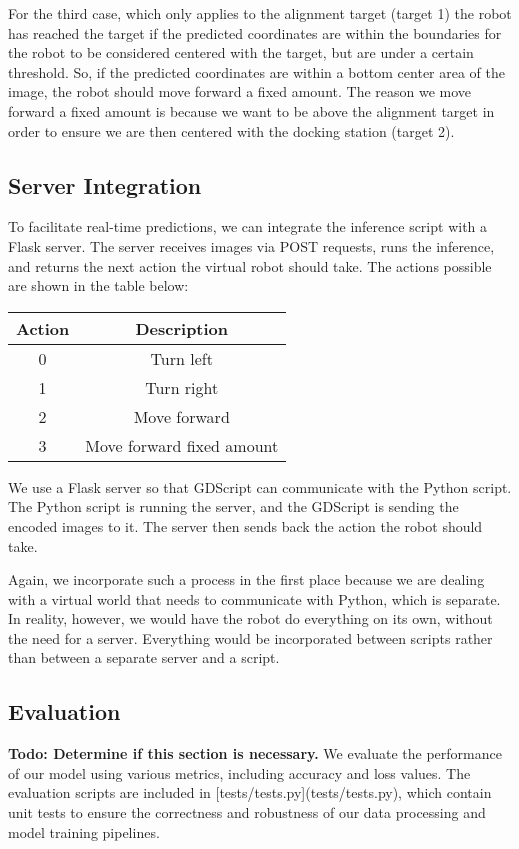 

For the third case, which only applies to the alignment target (target 1) the robot has reached the target if the predicted coordinates are within the boundaries for the robot to be considered centered with the target, but are under a certain threshold. So, if the predicted coordinates are within a bottom center area of the image, the robot should move forward a fixed amount. The reason we move forward a fixed amount is because we want to be above the alignment target in order to ensure we are then centered with the docking station (target 2).

\subsection{Server Integration}
To facilitate real-time predictions, we can integrate the inference script with a Flask server. The server receives images via POST requests, runs the inference, and returns the next action the virtual robot should take. The actions possible are shown in the table below: 

\begin{table}[H]
	\centering
	\begin{tabular}{|c|c|}
		\hline
		Action & Description \\ \hline
		0      & Turn left   \\ \hline
		1      & Turn right  \\ \hline
		2      & Move forward \\ \hline
		3      & Move forward fixed amount \\ \hline
	\end{tabular}
\end{table}

We use a Flask server so that GDScript can communicate with the Python script. The Python script is running the server, and the GDScript is sending the encoded images to it. The server then sends back the action the robot should take.

Again, we incorporate such a process in the first place because we are dealing with a virtual world that needs to communicate with Python, which is separate. In reality, however, we would have the robot do everything on its own, without the need for a server. Everything would be incorporated between scripts rather than between a separate server and a script.

\subsection{Evaluation}
\textbf{Todo: Determine if this section is necessary.}
We evaluate the performance of our model using various metrics, including accuracy and loss values. The evaluation scripts are included in [tests/tests.py](tests/tests.py), which contain unit tests to ensure the correctness and robustness of our data processing and model training pipelines.

